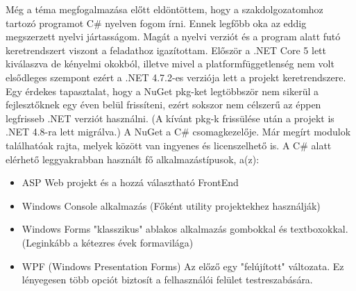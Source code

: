 
%
Még a téma megfogalmazása előtt eldöntöttem, hogy a szakdolgozatomhoz tartozó programot C\# nyelven fogom írni. Ennek legfőbb oka az eddig megszerzett nyelvi jártasságom. Magát a nyelvi verziót és a program alatt futó keretrendszert viszont a feladathoz igazítottam. Először a .NET Core 5 lett kiválaszva de kényelmi okokból, illetve mivel a platformfüggetlenség nem volt elsődleges szempont ezért  a .NET 4.7.2-es verziója lett a projekt keretrendszere. Egy érdekes tapasztalat, hogy a NuGet pkg-ket legtöbbször nem sikerül a fejlesztőknek egy éven belül frissíteni, ezért sokszor nem célszerű az éppen legfrisseb .NET verziót használni. (A kívánt pkg-k frissülése után a projekt is .NET 4.8-ra lett migrálva.) A NuGet a C\# csomagkezelője. Már megírt modulok találhatóak rajta, melyek között van ingyenes és licenszelhető is. A C\# alatt elérhető leggyakrabban használt fő alkalmazástípusok, a(z):
\begin{itemize}
\item ASP Web projekt és a hozzá választható FrontEnd\\
\item Windows Console alkalmazás (Főként utility projektekhez használják)
\item Windows Forms "klasszikus" ablakos alkalmazás gombokkal és textboxokkal. (Leginkább a kétezres évek formavilága)
\item WPF (Windows Presentation Forms) Az előző egy "felújított" változata. Ez lényegesen több opciót biztosít a felhasználói felület testreszabására.
\end{itemize}

